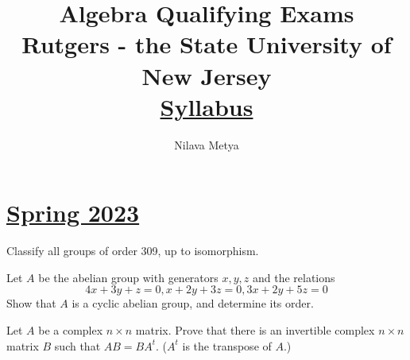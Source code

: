 
\usepackage{quiver}
\usepackage{listings}
\usepackage{fancyvrb,xcolor}
\usepackage{tcolorbox}
\usepackage{tabto}
\usepackage{wrapfig}
\newcommand{\catname}[1]{{\normalfont\textbf{#1}}}
\newcommand{\Set}{\catname{\sffamily Set }}
\newcommand{\Ring}{\catname{\sffamily Ring }}
\newcommand{\Group}{\catname{\sffamily Group }}
\newcommand{\pb}[2]{
\begin{tcolorbox}[
width=\textwidth,
colback={skybl},
title={#1},
]  
#2
\end{tcolorbox} 
}
\newcommand{\w}{\wedge}
\title{\vspace{-1in}\textbf{Algebra Qualifying Exams}\\
{\large{Rutgers - the State University of New Jersey}}\\
{\small{\href{https://www.math.rutgers.edu/docman-lister/math-main/academics/graduate/qualifying-exam/1266-syl2014/file}{Syllabus}
}}}

\author{\vspace{-2in}Nilava Metya}
\date{\vspace{-0.2in}}


\maketitle
\tableofcontents
\newpage


\section*{\href{https://www.math.rutgers.edu/docman-lister/math-main/2630-wq-jan-2023-all-3/file}{Spring 2023}}
\pb{Groups}{ 
Classify all groups of order 309, up to isomorphism.
}



\pb{Groups}{ 
Let $A$ be the abelian group with generators $x,y,z$ and the relations
$$4x+3y+z=0, x+2y+3z=0, 3x+2y+5z=0$$ Show that $A$ is a cyclic abelian group, and determine its order.
}


\pb{Linear Algebra}{ 
Let $A$ be a complex $n \times n$ matrix. Prove that there is an invertible complex $n \times n$ matrix $B$ such that $AB = BA^t$. ($A^t$ is the transpose of $A$.)
}

